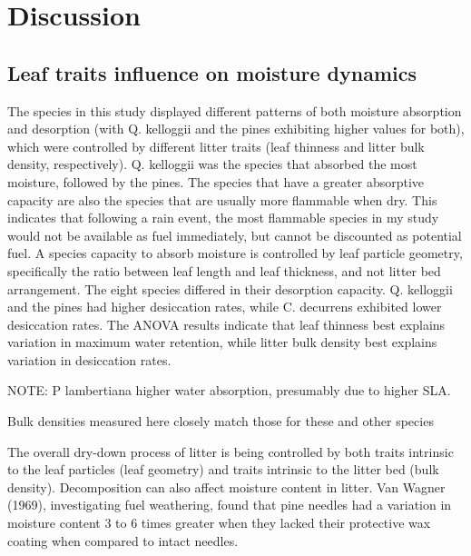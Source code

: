\documentclass[fire,article,submit,moreauthors,pdftex]{Definitions/mdpi}
\begin{document}


\section{Discussion}

\subsection{Leaf traits influence on moisture dynamics }

The species in this study displayed different patterns of both moisture absorption and desorption (with Q. kelloggii and the pines exhibiting higher values for both), which were controlled by different litter traits (leaf thinness and litter bulk density, respectively). Q. kelloggii was the species that absorbed the most moisture, followed by the pines. The species that have a greater absorptive capacity are also the species that are usually more flammable when dry. This indicates that following a rain event, the most flammable species in my study would not be available as fuel immediately, but cannot be discounted as potential fuel. A species capacity to absorb moisture is controlled by leaf particle geometry, specifically the ratio between leaf length and leaf thickness, and not litter bed arrangement. The eight species differed in their desorption capacity. Q. kelloggii and the pines had higher desiccation rates, while C. decurrens exhibited lower desiccation rates. The ANOVA results indicate that leaf thinness best explains variation in maximum water retention, while litter bulk density best explains variation in desiccation rates.

NOTE: P lambertiana higher water absorption, presumably due to higher SLA.



Bulk densities measured here closely match those for these and other species \cite{van_Wagtendonk+Sydoriak+etal-1998,Stephens+Finney+etal-2004}

The overall dry-down process of litter is being controlled by both traits intrinsic to the leaf particles (leaf geometry) and traits intrinsic to the litter bed (bulk density). Decomposition can also affect moisture content in litter. Van Wagner (1969), investigating fuel weathering, found that pine needles had a variation in moisture content 3 to 6 times greater when they lacked their protective wax coating when compared to intact needles.
\end{document}
